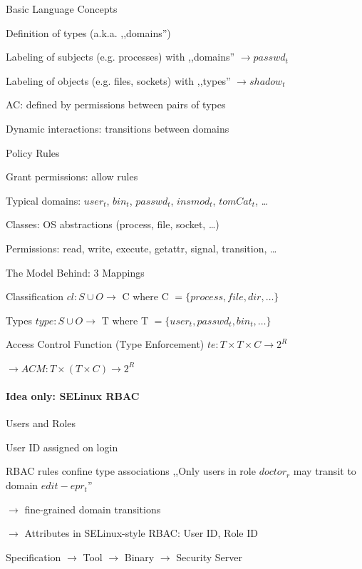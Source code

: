 \documentclass[a4paper]{article}
\begin{document}
\begin{multicols}{3}

    Basic Language Concepts
    \begin{itemize*}
        \item Definition of types (a.k.a. ,,domains'')
        \item Labeling of subjects (e.g. processes) with ,,domains'' $\rightarrow passwd_t$
        \item Labeling of objects (e.g. files, sockets) with ,,types'' $\rightarrow shadow_t$
        \item AC: defined by permissions between pairs of types
        \item Dynamic interactions: transitions between domains
    \end{itemize*}

    Policy Rules
    \begin{itemize*}
        \item Grant permissions: allow rules
        \item Typical domains: $user_t$, $bin_t$, $passwd_t$, $insmod_t$, $tomCat_t$, \dots
        \item Classes: OS abstractions (process, file, socket, \dots)
        \item Permissions: read, write, execute, getattr, signal, transition, \dots
    \end{itemize*}

    The Model Behind: 3 Mappings
    \begin{itemize*}
        \item Classification $cl : S\cup O \rightarrow$ C where C $=\{process, file, dir, \dots \}$
        \item Types $type: S\cup O \rightarrow$ T where T $=\{ user_t , passwd_t , bin_t , \dots \}$
        \item Access Control Function (Type Enforcement) $te : T\times T \times C \rightarrow 2^R$
        \item $\rightarrow ACM : T\times( T \times C ) \rightarrow 2^R$
    \end{itemize*}

    \paragraph{Idea only: SELinux RBAC}
    Users and Roles
    \begin{itemize*}
        \item User ID assigned on login
        \item RBAC rules confine type associations ,,Only users in role $doctor_r$ may transit to domain $edit-epr_t$''
        \item[$\rightarrow$] fine-grained domain transitions
        \item[$\rightarrow$] Attributes in SELinux-style RBAC: User ID, Role ID
        \item Specification $\rightarrow$ Tool $\rightarrow$ Binary $\rightarrow$ Security Server
    \end{itemize*}


\end{multicols}
\end{document}
